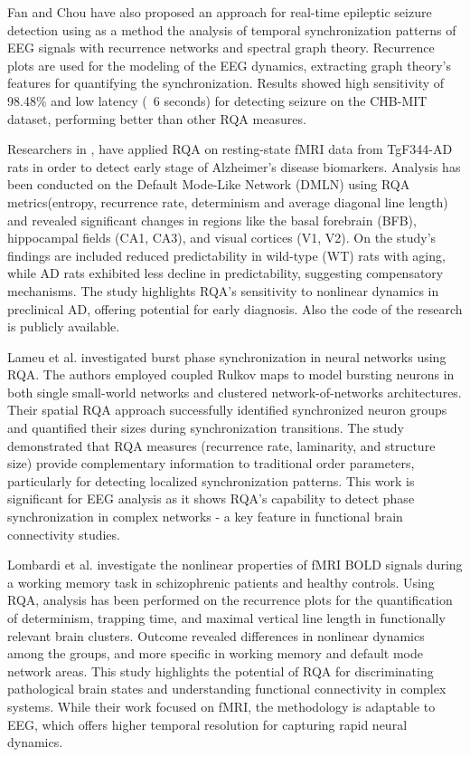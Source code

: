 \documentclass{article}
\begin{document}
			Fan and Chou \cite{fan2019detecting} have also proposed 
			an approach for real-time epileptic seizure detection
			using as a method the analysis of temporal synchronization 
			patterns of EEG signals with recurrence networks and spectral graph theory. 
			Recurrence plots are used for the modeling of the EEG dynamics, 
			extracting graph theory's features for quantifying the synchronization. 
			Results showed high sensitivity of 98.48\% and low latency
			(~6 seconds) for detecting seizure on the CHB-MIT dataset, 
			performing better than other RQA measures.  
			


			Researchers in \cite{rezaei},
			have applied RQA on resting-state fMRI data from TgF344-AD rats in order 
			to detect early stage of Alzheimer's disease biomarkers. 
			Analysis has been conducted on the Default Mode-Like Network (DMLN) 
			using RQA metrics(entropy, recurrence rate, determinism and average diagonal line length) 
			and revealed significant changes in regions like 
			the basal forebrain (BFB), hippocampal fields (CA1, CA3), and visual 
			cortices (V1, V2). 
			On the study's findings are included reduced predictability in 
			wild-type (WT) rats with aging, while AD rats exhibited less decline
			in predictability, suggesting compensatory mechanisms. 
			The study highlights RQA's sensitivity to nonlinear dynamics 
			in preclinical AD, offering potential for early diagnosis. Also the code of the
			research is publicly available.

			Lameu et al.\cite{lameu2018} investigated burst phase synchronization in neural networks using 
			RQA. The authors employed coupled Rulkov maps to model bursting neurons in both single small-world networks
			and clustered network-of-networks architectures. Their spatial RQA approach successfully identified 
			synchronized neuron groups and quantified their sizes during synchronization transitions. The study
			demonstrated that RQA measures (recurrence rate, laminarity, and structure size) provide complementary 
			information to traditional order parameters, particularly for detecting localized synchronization patterns. 
			This work is significant for EEG analysis as it shows RQA's capability to detect phase synchronization 
			in complex networks - a key feature in functional brain connectivity studies.

			Lombardi et al.\cite{Lombardi2014} investigate the nonlinear properties of fMRI BOLD signals 
			during a working memory task in schizophrenic patients and healthy controls. 
			Using RQA, analysis has been performed on the recurrence plots for the quantification of 
			determinism, trapping time, and maximal vertical line length 
			in functionally relevant brain clusters. 
			Outcome revealed differences in nonlinear dynamics among the groups, 
			and more specific in working memory and default mode network areas. 
			This study highlights the potential of RQA for discriminating pathological brain states and understanding 
			functional connectivity in complex systems. While their work focused on fMRI, the methodology is adaptable
			to EEG, which offers higher temporal resolution for capturing rapid neural dynamics.
\end{document}
